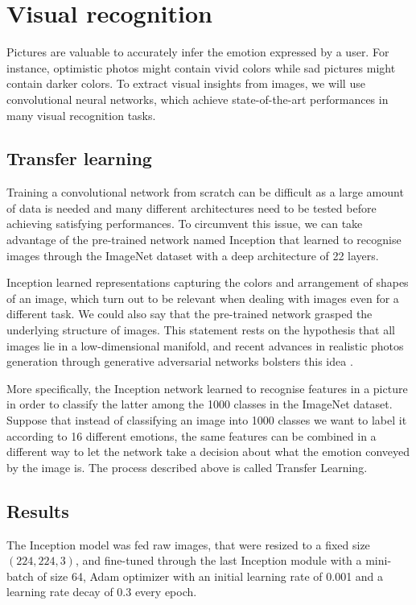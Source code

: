 \documentclass{article} %
\begin{document}
\section{Visual recognition}
Pictures are valuable to accurately infer the emotion expressed by a user. For instance, optimistic photos might contain vivid colors while sad pictures might contain darker colors. To extract visual insights from images, we will use convolutional neural networks, which achieve state-of-the-art performances in many visual recognition tasks.

\subsection{Transfer learning}
Training a convolutional network from scratch can be difficult as a large amount of data is needed and many different architectures need to be tested before achieving satisfying performances. To circumvent this issue, we can take advantage of the pre-trained network named Inception that learned to recognise images through the ImageNet dataset with a deep architecture of 22 layers.

Inception learned representations capturing the colors and arrangement of shapes of an image, which turn out to be relevant when dealing with images even for a different task. We could also say that the pre-trained network grasped the underlying structure of images. This statement rests on the hypothesis that all images lie in a low-dimensional manifold, and recent advances in realistic photos generation through generative adversarial networks bolsters this idea \citep{Radford-16}. 

More specifically, the Inception network learned to recognise features in a picture in order to classify the latter among the 1000 classes in the ImageNet dataset. Suppose that instead of classifying an image into 1000 classes we want to label it according to 16 different emotions, the same features can be combined in a different way to let the network take a decision about what the emotion conveyed by the image is. The process described above is called Transfer Learning.

\subsection{Results}
The Inception model was fed raw images, that were resized to a fixed size $(224, 224, 3)$, and fine-tuned through the last Inception module \citep{Szegedy-15} with a mini-batch of size 64, Adam optimizer with an initial learning rate of 0.001 and a learning rate decay of 0.3 every epoch.
\end{document}

